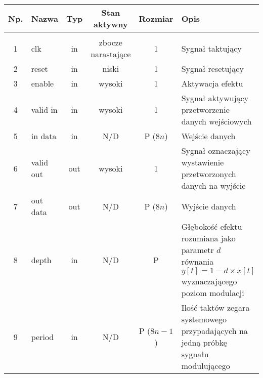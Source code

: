 \setcounter{table}{0}
\begin{table}[t]
\small
\centering
\begin{tabular}{|c|l|c|c|c|m{4.5cm}|}
\hline
\rowcolor[HTML]{C0C0C0}
\textbf{Np.} & \textbf{Nazwa} & \textbf{Typ} & \textbf{Stan aktywny} & \textbf{Rozmiar} & \textbf{Opis} \\ \hline
\rowcolor[HTML]{34CDF9}\multicolumn{6}{|l|}{Efekt tremolo} \\ \hline
1            & clk       & in           & zbocze narastające    & 1                 & Sygnał taktujący                                                                                                           \\ \hline
2            & reset     & in           & niski                 & 1                 & Sygnał resetujący                                                                                                          \\ \hline
3            & enable    & in           & wysoki                & 1                 & Aktywacja efektu                                                                                                           \\ \hline
4            & valid in  & in           & wysoki                & 1                 & Sygnał aktywujący przetworzenie danych wejściowych                                                                         \\ \hline
5            & in data   & in           & N/D                   & P ($8n$)          & Wejście danych                                                                                                             \\ \hline
6            & valid out & out          & wysoki                & 1                 & Sygnał oznaczający wystawienie przetworzonych danych na wyjście                                                            \\ \hline
7            & out data  & out          & N/D                   & P ($8n$)          & Wyjście danych                                                                                                             \\ \hline
8            & depth     & in           & N/D                   & P                 & Głębokość efektu rozumiana jako parametr $d$ równania $y[t] = 1 - d \times x[t]$ wyznaczającego poziom modulacji           \\ \hline
9            & period    & in           & N/D                   & P ($8n-1$)        & Ilość taktów zegara systemowego przypadających na jedną próbkę sygnału modulującego                                        \\ \hline

\end{tabular}
\end{table}
